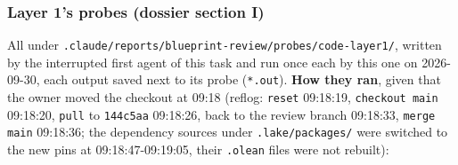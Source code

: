 \subsubsection{Layer 1's probes (dossier section I)}\label{sec:gen-probes-layer1}

\par{}\par

All under \texttt{.\allowbreak{}c\allowbreak{}l\allowbreak{}a\allowbreak{}u\allowbreak{}d\allowbreak{}e\allowbreak{}/\allowbreak{}r\allowbreak{}e\allowbreak{}p\allowbreak{}o\allowbreak{}r\allowbreak{}t\allowbreak{}s\allowbreak{}/\allowbreak{}b\allowbreak{}l\allowbreak{}u\allowbreak{}e\allowbreak{}p\allowbreak{}r\allowbreak{}i\allowbreak{}n\allowbreak{}t\allowbreak{}-{}\allowbreak{}r\allowbreak{}e\allowbreak{}v\allowbreak{}i\allowbreak{}e\allowbreak{}w\allowbreak{}/\allowbreak{}p\allowbreak{}r\allowbreak{}o\allowbreak{}b\allowbreak{}e\allowbreak{}s\allowbreak{}/\allowbreak{}c\allowbreak{}o\allowbreak{}d\allowbreak{}e\allowbreak{}-{}\allowbreak{}l\allowbreak{}a\allowbreak{}y\allowbreak{}e\allowbreak{}r\allowbreak{}1\allowbreak{}/}, written by the interrupted first agent of this task and run once each by this one on 2026-09-30, each output saved next to its probe (\texttt{*.\allowbreak{}out}). \textbf{How they ran}, given that the owner moved the checkout at 09:18 (reflog: \texttt{reset} 09:18:19, \texttt{checkout main} 09:18:20, \texttt{pull} to \texttt{144c5aa} 09:18:26, back to the review branch 09:18:33, \texttt{merge main} 09:18:36; the dependency sources under \texttt{.\allowbreak{}lake/\allowbreak{}packages/} were switched to the new pins at 09:18:47-09:19:05, their \texttt{.\allowbreak{}olean} files were not rebuilt):

